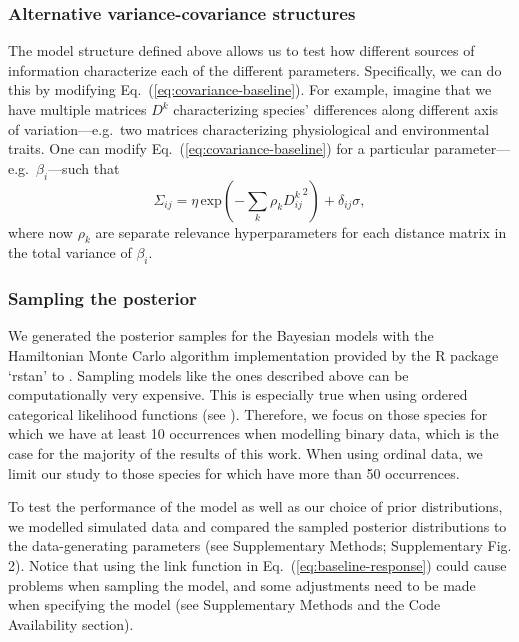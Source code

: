 \documentclass[11pt, a4paper]{article}
\begin{document}
\subsubsection*{Alternative variance-covariance structures}
The model structure defined above allows us to test how different sources of information characterize each of the different parameters. Specifically, we can do this by modifying Eq.~(\ref{eq:covariance-baseline}). For example, imagine that we have multiple matrices $D^k$ characterizing species' differences along different axis of variation---e.g.~two matrices characterizing physiological and environmental traits. One can modify Eq.~(\ref{eq:covariance-baseline}) for a particular parameter---e.g.~$\beta_{i}$---such that
\begin{equation} 
\Sigma_{ij} = \eta\,\text{exp}\left(-\sum_k\rho_{k} {D^{k}_{ij}}^2\right) + \delta_{ij} \sigma ,
\label{eq:covariance-complex}
\end{equation}
where now $\rho_{k}$ are separate relevance hyperparameters for each distance matrix in the total variance of $\beta_i$.

\subsubsection*{Sampling the posterior}
We generated the posterior samples for the Bayesian models with the Hamiltonian Monte Carlo algorithm implementation provided by the R package `rstan' to \citep{standevelopentteamRStanInterfaceStan2021}. Sampling models like the ones described above can be computationally very expensive. This is especially true when using ordered categorical likelihood functions (see \citealt{standevelopmentteamStanModelingLanguage2021}). Therefore, we focus on those species for which we have at least 10 occurrences when modelling binary data, which is the case for the majority of the results of this work. When using ordinal data, we limit our study to those species for which have more than 50 occurrences.

To test the performance of the model as well as our choice of prior distributions, we modelled simulated data and compared the sampled posterior distributions to the data-generating parameters (see Supplementary Methods; Supplementary Fig. 2). Notice that using the link function in Eq.~(\ref{eq:baseline-response}) could cause problems when sampling the model, and some adjustments need to be made when specifying the model (see Supplementary Methods and the Code Availability section). 
\end{document}
